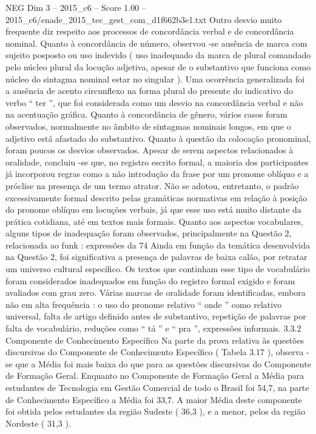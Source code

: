 \begin{textsample}{NEG Dim 3 – 2015\_c6 – Score 1.00 – 2015\_c6/enade\_2015\_tec\_gest\_com\_d1f662b3e1.txt}
Outro desvio muito frequente diz respeito aos processos de concordância verbal e de concordância nominal.
Quanto à concordância de número, observou -se ausência de marca com sujeito posposto ou uso indevido ( uso inadequado da marca de plural comandado pelo núcleo plural da locução adjetiva, apesar de o substantivo que funciona como núcleo do sintagma nominal estar no singular ).
Uma ocorrência generalizada foi a ausência de acento circunflexo na forma plural do presente do indicativo do verbo “ ter ”, que foi considerada como um desvio na concordância verbal e não na acentuação gráfica.
Quanto à concordância de gênero, vários casos foram observados, normalmente no âmbito de sintagmas nominais longos, em que o adjetivo está afastado do substantivo.
Quanto à questão da colocação pronominal, foram poucos os desvios observados.
Apesar de serem aspectos relacionados à oralidade, concluiu -se que, no registro escrito formal, a maioria dos participantes já incorporou regras como a não introdução da frase por um pronome oblíquo e a próclise na presença de um termo atrator.
Não se adotou, entretanto, o padrão excessivamente formal descrito pelas gramáticas normativas em relação à posição do pronome oblíquo em locuções verbais, já que esse uso está muito distante da prática cotidiana, até em textos mais formais.
Quanto aos aspectos vocabulares, alguns tipos de inadequação foram observados, principalmente na Questão 2, relacionada ao funk : expressões da 74 Ainda em função da temática desenvolvida na Questão 2, foi significativa a presença de palavras de baixa calão, por retratar um universo cultural específico.
Os textos que continham esse tipo de vocabulário foram considerados inadequados em função do registro formal exigido e foram avaliados com grau zero.
Várias marcas de oralidade foram identificadas, embora não em alta frequência : o uso do pronome relativo “ onde ” como relativo universal, falta de artigo definido antes de substantivo, repetição de palavras por falta de vocabulário, reduções como “ tá ” e “ pra ”, expressões informais. 3.3.2 Componente de Conhecimento Específico Na parte da prova relativa às questões discursivas do Componente de Conhecimento Específico ( Tabela 3.17 ), observa -se que a Média foi mais baixa do que para as questões discursivas do Componente de Formação Geral.
Enquanto no Componente de Formação Geral a Média para estudantes de Tecnologia em Gestão Comercial de todo o Brasil foi 54,7, na parte de Conhecimento Específico a Média foi 33,7.
A maior Média deste componente foi obtida pelos estudantes da região Sudeste ( 36,3 ), e a menor, pelos da região Nordeste ( 31,3 ).

\end{textsample}

